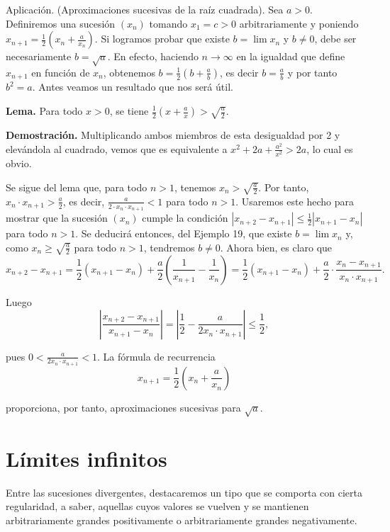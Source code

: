 \documentclass[12pt,oneside]{book}
\begin{document}
Aplicación. (Aproximaciones sucesivas de la raíz cuadrada). Sea \(a > 0\). Definiremos una sucesión \((x_n)\) tomando \(x_1 = c > 0\) arbitrariamente y poniendo \(x_{n+1} = \frac{1}{2} \left( x_n + \frac{a}{x_n} \right)\). Si logramos probar que existe \(b = \lim x_n\) y \(b \neq 0\), debe ser necesariamente \(b = \sqrt{a}\). En efecto, haciendo \(n \to \infty\) en la igualdad que define \(x_{n+1}\) en función de \(x_n\), obtenemos \(b = \frac{1}{2} \left( b + \frac{a}{b} \right)\), es decir \(b = \frac{a}{b}\) y por tanto \(b^2 = a\). Antes veamos un resultado que nos será útil.

\textbf{Lema.} Para todo \(x > 0\), se tiene \(\frac{1}{2} \left( x + \frac{a}{x} \right) > \sqrt{\frac{a}{2}}\).

\textbf{Demostración.} Multiplicando ambos miembros de esta desigualdad por 2 y elevándola al cuadrado, vemos que es equivalente a \(x^2 + 2a + \frac{a^2}{x^2} > 2a\), lo cual es obvio.

Se sigue del lema que, para todo \(n > 1\), tenemos \(x_n > \sqrt{\frac{a}{2}}\). Por tanto, \(x_n \cdot x_{n+1} > \frac{a}{2}\), es decir, \(\frac{a}{2 \cdot x_n \cdot x_{n+1}} < 1\) para todo \(n > 1\). Usaremos este hecho para mostrar que la sucesión \((x_n)\) cumple la condición \(|x_{n+2} - x_{n+1}| \le \frac{1}{2} |x_{n+1} - x_n|\) para todo \(n > 1\). Se deducirá entonces, del Ejemplo 19, que existe \(b = \lim x_n\) y, como \(x_n \ge \sqrt{\frac{a}{2}}\) para todo \(n > 1\), tendremos \(b \neq 0\). Ahora bien, es claro que
\[
x_{n+2} - x_{n+1} = \frac{1}{2} (x_{n+1} - x_n) + \frac{a}{2} \left( \frac{1}{x_{n+1}} - \frac{1}{x_n} \right) = \frac{1}{2} (x_{n+1} - x_n) + \frac{a}{2} \cdot \frac{x_n - x_{n+1}}{x_n \cdot x_{n+1}}.
\]

Luego
\[
\left| \frac{x_{n+2} - x_{n+1}}{x_{n+1} - x_n} \right| = \left| \frac{1}{2} - \frac{a}{2x_n \cdot x_{n+1}} \right| \leq \frac{1}{2},
\]

pues \(0 < \frac{a}{2x_n \cdot x_{n+1}} < 1\). La fórmula de recurrencia
\[
x_{n+1} = \frac{1}{2} \left( x_n + \frac{a}{x_n} \right)
\]

proporciona, por tanto, aproximaciones sucesivas para \(\sqrt{a}\).

\section{Límites infinitos}

Entre las sucesiones divergentes, destacaremos un tipo que se comporta con cierta regularidad, a saber, aquellas cuyos valores se vuelven y se mantienen arbitrariamente grandes positivamente o arbitrariamente grandes negativamente.
\end{document}
